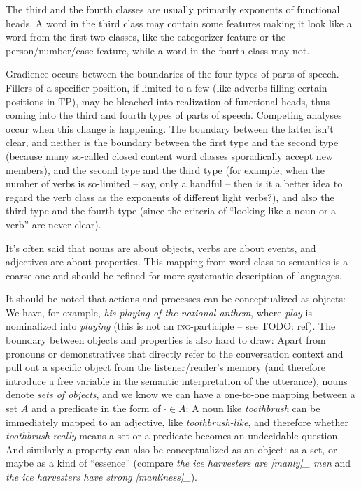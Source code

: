 \documentclass[UTF8, a4paper, oneside, scheme=plain, 12pt]{ctexbook}
\newcommand{\form}[1]{\emph{#1}}
\newcommand{\formcat}[1]{\textsc{#1}}
\begin{document}
{The third and the fourth classes are usually primarily exponents of functional heads.
A word in the third class may contain some features making it look like a word from the first two classes,
like the categorizer feature or the person/number/case feature,
while a word in the fourth class may not.

Gradience occurs between the boundaries of the four types of parts of speech.
Fillers of a specifier position,
if limited to a few (like adverbs filling certain positions in TP),
may be bleached into realization of functional heads,
thus coming into the third and fourth types of parts of speech.
Competing analyses occur when this change is happening.
The boundary between the latter isn't clear,
and neither is the boundary between the first type and the second type
(because many so-called closed content word classes 
sporadically accept new members),
and the second type and the third type
(for example, when the number of verbs is so-limited -- say, only a handful -- 
then is it a better idea to regard the verb class as the exponents of different light verbs?),
and also the third type and the fourth type
(since the criteria of ``looking like a noun or a verb'' are never clear).

It's often said that nouns are about objects, 
verbs are about events,
and adjectives are about properties.
This mapping from word class to semantics is a coarse one 
and should be refined for more systematic description of languages.

It should be noted that actions and processes can be conceptualized as objects:
We have, for example, \form{his playing of the national anthem},
where \form{play} is nominalized into \form{playing}
(this is not an \formcat{ing}-participle -- see TODO: ref).
The boundary between objects and properties is also hard to draw:
Apart from pronouns or demonstratives 
that directly refer to the conversation context 
and pull out a specific object from the listener/reader's memory
(and therefore introduce a free variable in the semantic interpretation of the utterance),
nouns denote \emph{sets of objects},
and we know we can have a one-to-one mapping 
between a set $A$ and a predicate in the form of $\cdot \in A$:
A noun like \form{toothbrush} 
can be immediately mapped to an adjective, like \form{toothbrush-like},
and therefore whether \form{toothbrush} \emph{really} means 
a set or a predicate becomes an undecidable question.
And similarly a property can also be conceptualized as an object: 
as a set, or maybe as a kind of ``essence''
(compare \form{the ice harvesters are [manly]_{} men}
and \form{the ice harvesters have strong [manliness]_{}}).

}
\end{document}
